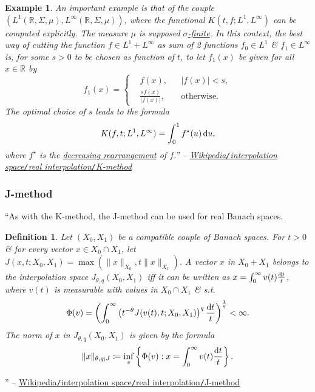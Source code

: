 \documentclass[oneside]{book}
\numberwithin{equation}{section}
\newtheorem{definition}{Definition}[chapter]
\newtheorem{example}{Example}[chapter]
\begin{document}
\begin{example}
	An important example is that of the couple $(L^1(\mathbb{R},\Sigma,\mu),L^\infty(\mathbb{R},\Sigma,\mu))$, where the functional $K(t,f;L^1,L^\infty)$ can be computed explicitly. The measure $\mu$ is supposed \href{https://en.wikipedia.org/wiki/%CE%A3-finite_measure}{$\sigma$-finite}. In this context, the best way of cutting the function $f\in L^1 + L^\infty$ as sum of 2 functions $f_0\in L^1$ \& $f_1\in L^\infty$ is, for some $s > 0$ to be chosen as function of $t$, to let $f_1(x)$ be given for all $x\in\mathbb{R}$ by
	\begin{equation*}
		f_1(x) = \left\{\begin{split}
			&f(x),&&|f(x)| < s,\\
			&\frac{sf(x)}{|f(x)|},&&\mbox{otherwise}.
		\end{split}\right.
	\end{equation*}
	The optimal choice of $s$ leads to the formula
	\begin{align*}
		K(f,t;L^1,L^\infty) = \int_0^1 f^\star(u)\,{\rm d}u,
	\end{align*}
	where $f^\star$ is the \href{https://en.wikipedia.org/wiki/Lorentz_space#Decreasing_rearrangements}{decreasing rearrangement} of $f$.'' -- \href{https://en.wikipedia.org/wiki/Interpolation_space#K-method}{Wikipedia\texttt{/}interpolation space\texttt{/}real interpolation\texttt{/}K-method}
\end{example}

\subsubsection{J-method}
``As with the K-method, the J-method can be used for real Banach spaces.

\begin{definition}
	Let $(X_0,X_1)$ be a compatible couple of Banach spaces. For $t > 0$ \& for every vector $x\in X_0\cap X_1$, let $J(x,t;X_0,X_1) = \max(\|x\|_{X_0},t\|x\|_{X_1})$. A vector $x$ in $X_0 + X_1$ belongs to the interpolation space $J_{\theta,q}(X_0,X_1)$ iff it can be written as $x = \int_0^\infty v(t)\frac{{\rm d}t}{t}$, where $v(t)$ is measurable with values in $X_0\cap X_1$ \& s.t.
	\begin{align*}
		\Phi(v) = \left(\int_0^\infty \left(t^{-\theta}J(v(t),t;X_0,X_1)\right)^q\frac{{\rm d}t}{t}\right)^{\frac{1}{q}} < \infty.
	\end{align*}
	The norm of $x$ in $J_{\theta,q}(X_0,X_1)$ is given by the formula
	\begin{align*}
		\|x\|_{\theta,q;J}\coloneqq\inf_v\left\{\Phi(v):x = \int_0^\infty v(t)\frac{{\rm d}t}{t}\right\}.
	\end{align*}
\end{definition}
\noindent'' -- \href{https://en.wikipedia.org/wiki/Interpolation_space#J-method}{Wikipedia\texttt{/}interpolation space\texttt{/}real interpolation\texttt{/}J-method}
\end{document}
